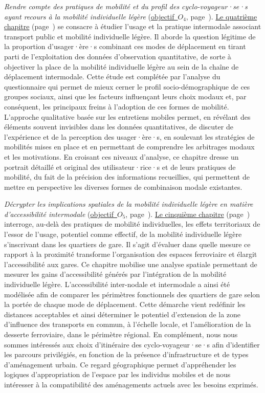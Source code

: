 \textsl{Rendre compte des pratiques de mobilité et du profil des cyclo-voyageur·se·s ayant recours à la mobilité individuelle légère} (\hyperref[objectif-4]{objectif~\(O_4\)}, page~\pageref{objectif-4}). \hyperref[chap4:titre]{Le quatrième chapitre} (page~\pageref{chap4:titre}) se consacre à étudier l'usage et la pratique intermodale associant transport public et mobilité individuelle légère. Il aborde la question légitime de la proportion d'usager·ère·s combinant ces modes de déplacement en tirant parti de l'exploitation des données d'observation quantitative, de sorte à objectiver la place de la mobilité individuelle légère au sein de la chaîne de déplacement intermodale. Cette étude est complétée par l'analyse du questionnaire qui permet de mieux cerner le profil socio-démographique de ces groupes sociaux, ainsi que les facteurs influençant leurs choix modaux et, par conséquent, les principaux freins à l'adoption de ces formes de mobilité. L'approche qualitative basée sur les entretiens mobiles permet, en révélant des éléments souvent invisibles dans les données quantitatives, de discuter de l'expérience et de la perception des usager·ère·s, en soulevant les stratégies de mobilités mises en place et en permettant de comprendre les arbitrages modaux et les motivations. En croisant ces niveaux d'analyse, ce chapitre dresse un portrait détaillé et original des utilisateur·rice·s et de leurs pratiques de mobilité, du fait de la précision des informations recueillies, qui permettent de mettre en perspective les diverses formes de combinaison modale existantes.%

\textsl{Décrypter les implications spatiales de la mobilité individuelle légère en matière d'accessibilité intermodale} (\hyperref[objectif-5]{objectif~\(O_5\)}, page~\pageref{objectif-5}). \hyperref[chap5:titre]{Le cinquième chapitre} (page~\pageref{chap5:titre}) interroge, au-delà des pratiques de mobilité individuelles, les effets territoriaux de l'essor de l'usage, potentiel comme effectif, de la mobilité individuelle légère s'inscrivant dans les quartiers de gare. Il s'agit d'évaluer dans quelle mesure ce rapport à la proximité transforme l'organisation des espaces ferroviaire et élargit l'accessibilité aux gares. Ce chapitre mobilise une analyse spatiale permettant de mesurer les gains d'accessibilité générés par l'intégration de la mobilité individuelle légère. L'accessibilité inter-nodale et intermodale a ainsi été modélisée afin de comparer les périmètres fonctionnels des quartiers de gare selon la portée de chaque mode de déplacement. Cette démarche vient redéfinir les distances acceptables et ainsi déterminer le potentiel d'extension de la zone d'influence des transports en commun, à l'échelle locale, et l'amélioration de la desserte ferroviaire, dans le périmètre régional. En complément, nous nous sommes intéressés aux choix d'itinéraire des cyclo-voyageur·se·s afin d'identifier les parcours privilégiés, en fonction de la présence d'infrastructure et de types d'aménagement urbain. Ce regard géographique permet d'appréhender les logiques d'appropriation de l'espace par les individus mobiles et de nous intéresser à la compatibilité des aménagements actuels avec les besoins exprimés.%